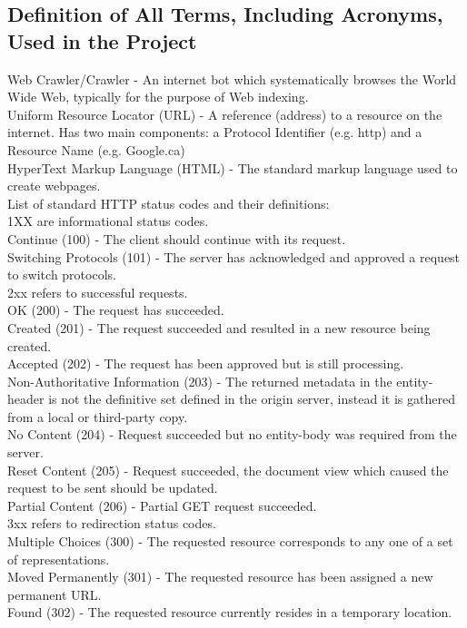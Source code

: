 \documentclass[titlepage]{article}
\begin{document}
\subsection*{Definition of All Terms, Including Acronyms, Used in the Project}
Web Crawler/Crawler - An internet bot which systematically browses the World Wide Web, typically for the purpose of Web indexing.
\\
Uniform Resource Locator (URL) - A reference (address) to a resource on the internet. Has two main components: a Protocol Identifier (e.g. http) and a Resource Name (e.g. Google.ca)
\\
HyperText Markup Language (HTML) - The standard markup language used to create webpages.
\\
List of standard HTTP status codes and their definitions:
\\
1XX are informational status codes.
\\
Continue (100) - The client should continue with its request.
\\
Switching Protocols (101) - The server has acknowledged and approved a request to switch protocols.
\\
2xx refers to successful requests.
\\
OK (200) - The request has succeeded.
\\
Created (201) - The request succeeded and resulted in a new resource being created.
\\
Accepted (202) - The request has been approved but is still processing.
\\
Non-Authoritative Information (203) - The returned metadata in the entity-header is not the definitive set defined in the origin server, instead it is gathered from a local or third-party copy.
\\
No Content (204) - Request succeeded but no entity-body was required from the server.
\\
Reset Content (205) - Request succeeded, the document view which caused the request to be sent should be updated.
\\
Partial Content (206) - Partial GET request succeeded.
\\
3xx refers to redirection status codes.
\\
Multiple Choices (300) - The requested resource corresponds to any one of a set of representations.
\\
Moved Permanently (301) - The requested resource has been assigned a new permanent URL.
\\
Found (302) - The requested resource currently resides in a temporary location.
\end{document}
